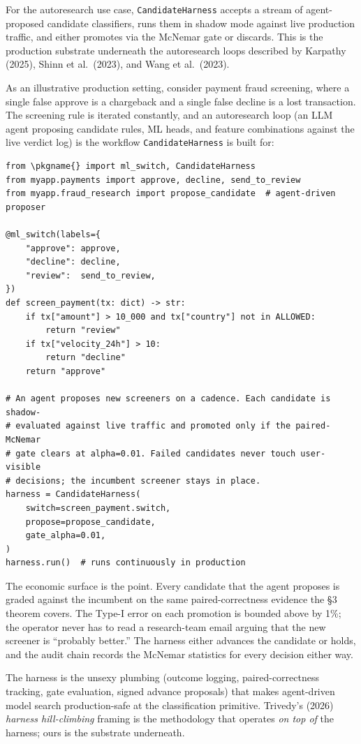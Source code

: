 For the autoresearch use case, \texttt{CandidateHarness} accepts a
stream of agent-proposed candidate classifiers, runs them in shadow mode
against live production traffic, and either promotes via the McNemar
gate or discards. This is the production substrate underneath the
autoresearch loops described by Karpathy (2025), Shinn et al.~(2023),
and Wang et al.~(2023).

As an illustrative production setting, consider payment fraud screening,
where a single false approve is a chargeback and a single false decline
is a lost transaction. The screening rule is iterated constantly, and an
autoresearch loop (an LLM agent proposing candidate rules, ML heads, and
feature combinations against the live verdict log) is the workflow
\texttt{CandidateHarness} is built for:

\begin{verbatim}
from \pkgname{} import ml_switch, CandidateHarness
from myapp.payments import approve, decline, send_to_review
from myapp.fraud_research import propose_candidate  # agent-driven proposer

@ml_switch(labels={
    "approve": approve,
    "decline": decline,
    "review":  send_to_review,
})
def screen_payment(tx: dict) -> str:
    if tx["amount"] > 10_000 and tx["country"] not in ALLOWED:
        return "review"
    if tx["velocity_24h"] > 10:
        return "decline"
    return "approve"

# An agent proposes new screeners on a cadence. Each candidate is shadow-
# evaluated against live traffic and promoted only if the paired-McNemar
# gate clears at alpha=0.01. Failed candidates never touch user-visible
# decisions; the incumbent screener stays in place.
harness = CandidateHarness(
    switch=screen_payment.switch,
    propose=propose_candidate,
    gate_alpha=0.01,
)
harness.run()  # runs continuously in production
\end{verbatim}

The economic surface is the point. Every candidate that the agent
proposes is graded against the incumbent on the same paired-correctness
evidence the §3 theorem covers. The Type-I error on each promotion is
bounded above by 1\%; the operator never has to read a research-team
email arguing that the new screener is ``probably better.'' The harness
either advances the candidate or holds, and the audit chain records the
McNemar statistics for every decision either way.

The harness is the unsexy plumbing (outcome logging, paired-correctness
tracking, gate evaluation, signed advance proposals) that makes
agent-driven model search production-safe at the classification
primitive. Trivedy's (2026) \emph{harness hill-climbing} framing is the
methodology that operates \emph{on top of} the harness; ours is the
substrate underneath.

